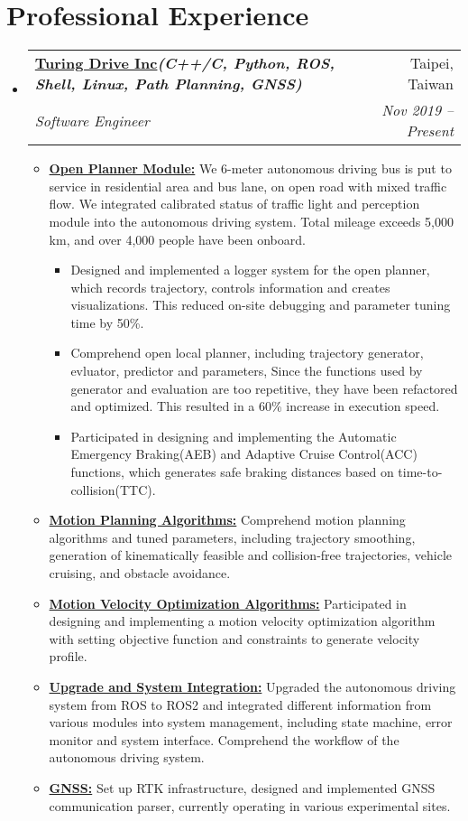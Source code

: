 \documentclass[letterpaper,11pt]{article}
\makeatletter
\newcommand{\resumeItem}[1]{
  \item\small{
    {#1 \vspace{-2pt}}
  }
}
\newcommand{\resumeSubheading}[4]{
  \vspace{-2pt}\item
    \begin{tabular*}{0.97\textwidth}[t]{l@{\extracolsep{\fill}}r}
      \textbf{#1} & #2 \\
      \textit{\small#3} & \textit{\small #4} \\
    \end{tabular*}\vspace{-7pt}
}
\newcommand{\resumeSubHeadingListStart}{\begin{itemize}[leftmargin=0.15in, label={}]}
\newcommand{\resumeSubHeadingListEnd}{\end{itemize}}
\newcommand{\resumeItemListStart}{\begin{itemize}}
\newcommand{\resumeItemListEnd}{\end{itemize}\vspace{-5pt}}
\makeatother
\begin{document}
\section{\textbf{Professional Experience}}
  \vspace{3pt}
  \resumeSubHeadingListStart

    \resumeSubheading 
      {\href{https://turing-drive.com/zh/home-zh/}{\color{blue}Turing Drive Inc}\emph{\scriptsize{(C++/C, Python, ROS, Shell, Linux, Path Planning, GNSS)}}}{Taipei, Taiwan}
      {Software Engineer}{Nov 2019 -- Present}
      \resumeItemListStart
      \resumeItem{\underline{\textbf{Open Planner Module:}} We 6-meter autonomous driving bus is put to service in  residential area and bus lane, on open road with mixed traffic flow. We integrated calibrated status of traffic light and perception module into the autonomous driving system. Total mileage exceeds 5,000 km, and over 4,000 people have been onboard.}
      \resumeItemListStart
        \resumeItem{Designed and implemented a logger system for the open planner, which records trajectory, controls information and creates visualizations. This reduced on-site debugging and parameter tuning time by 50\%.}
        \resumeItem{Comprehend open local planner, including trajectory generator, evluator, predictor and parameters, Since the functions used by generator and evaluation are too repetitive, they have been refactored and optimized. This resulted in a 60\% increase in execution speed.}
        \resumeItem{Participated in designing and implementing the Automatic Emergency Braking(AEB) and Adaptive Cruise Control(ACC) functions, which generates safe braking distances based on time-to-collision(TTC).}
      \resumeItemListEnd
      \resumeItem{\underline{\textbf{Motion Planning Algorithms:}} Comprehend motion planning algorithms and tuned parameters, including trajectory smoothing, generation of kinematically feasible and collision-free trajectories, vehicle cruising, and obstacle avoidance.}
      \resumeItem{\underline{\textbf{Motion Velocity Optimization Algorithms:}} Participated in designing and implementing a motion velocity optimization algorithm with setting objective function and constraints to generate velocity profile.}
      \resumeItem{\underline{\textbf{Upgrade and System Integration:}} Upgraded the autonomous driving system from ROS to ROS2 and integrated different information from various modules into system management, including state machine, error monitor and system interface. Comprehend the workflow of the autonomous driving system.}
      \resumeItem{\underline{\textbf{GNSS:}} Set up RTK infrastructure, designed and implemented GNSS communication parser, currently operating in various experimental sites.}
    \resumeItemListEnd
  \resumeSubHeadingListEnd
  
\end{document}
